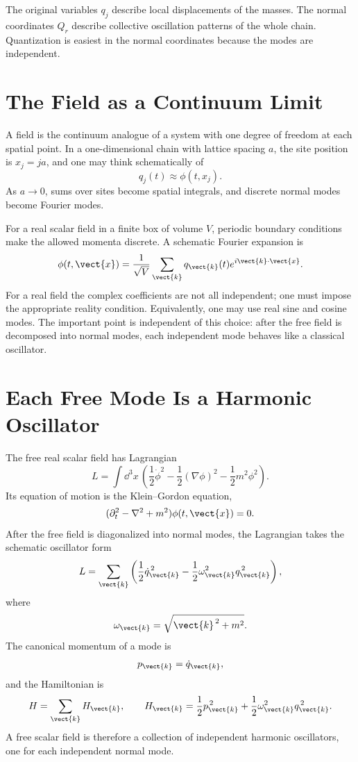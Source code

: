 \begin{examplebox}
The original variables \(q_j\) describe local displacements of the masses. The
normal coordinates \(Q_r\) describe collective oscillation patterns of the whole
chain. Quantization is easiest in the normal coordinates because the modes are
independent.
\end{examplebox}

\section{The Field as a Continuum Limit}

A field is the continuum analogue of a system with one degree of freedom at each
spatial point. In a one-dimensional chain with lattice spacing \(a\), the site
position is \(x_j=ja\), and one may think schematically of
\[
    q_j(t) \approx \phi(t,x_j).
\]
As \(a\to0\), sums over sites become spatial integrals, and discrete normal
modes become Fourier modes.

For a real scalar field in a finite box of volume \(V\), periodic boundary
conditions make the allowed momenta discrete. A schematic Fourier expansion is
\[
    \phi(t,\vect{x})
    = \frac{1}{\sqrt{V}}\sum_{\vect{k}}q_{\vect{k}}(t)
      e^{i\vect{k}\cdot\vect{x}}.
\]
For a real field the complex coefficients are not all independent; one must
impose the appropriate reality condition. Equivalently, one may use real sine
and cosine modes. The important point is independent of this choice: after the
free field is decomposed into normal modes, each independent mode behaves like a
classical oscillator.

\section{Each Free Mode Is a Harmonic Oscillator}

The free real scalar field has Lagrangian
\[
    L
    = \int \dd^3x\,
    \left(
        \frac{1}{2}\dot\phi^2
        - \frac{1}{2}(\nabla\phi)^2
        - \frac{1}{2}m^2\phi^2
    \right).
\]
Its equation of motion is the Klein--Gordon equation,
\[
    (\partial_t^2-\nabla^2+m^2)\phi(t,\vect{x})=0.
\]
After the free field is diagonalized into normal modes, the Lagrangian takes the
schematic oscillator form
\[
    L
    = \sum_{\vect{k}}
    \left(
        \frac{1}{2}\dot q_{\vect{k}}^{\,2}
        - \frac{1}{2}\omega_{\vect{k}}^2q_{\vect{k}}^{\,2}
    \right),
\]
where
\[
    \omega_{\vect{k}}=\sqrt{\vect{k}^{\,2}+m^2}.
\]
The canonical momentum of a mode is
\[
    p_{\vect{k}}=\dot q_{\vect{k}},
\]
and the Hamiltonian is
\[
    H
    = \sum_{\vect{k}}H_{\vect{k}},
    \qquad
    H_{\vect{k}}
    = \frac{1}{2}p_{\vect{k}}^{\,2}
      + \frac{1}{2}\omega_{\vect{k}}^2q_{\vect{k}}^{\,2}.
\]
A free scalar field is therefore a collection of independent harmonic
oscillators, one for each independent normal mode.


